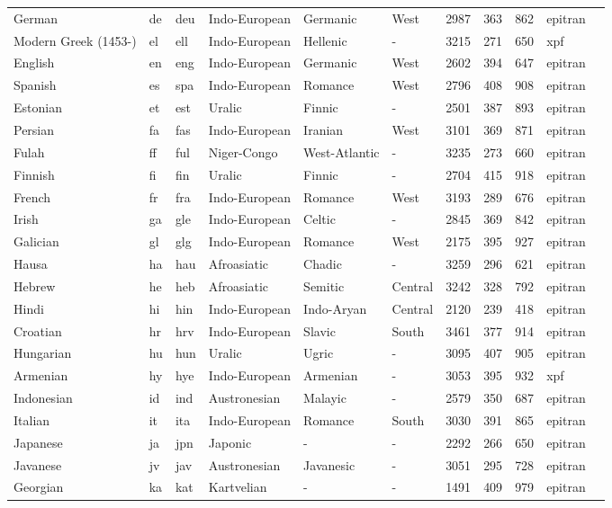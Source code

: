 \begin{longtable}{lllllllllll}
German & de & deu & Indo-European & Germanic & West & 2987 & 363 & 862 & epitran \\
Modern Greek (1453-) & el & ell & Indo-European & Hellenic & - & 3215 & 271 & 650 & xpf \\
English & en & eng & Indo-European & Germanic & West & 2602 & 394 & 647 & epitran \\
Spanish & es & spa & Indo-European & Romance & West & 2796 & 408 & 908 & epitran \\
Estonian & et & est & Uralic & Finnic & - & 2501 & 387 & 893 & epitran \\
Persian & fa & fas & Indo-European & Iranian & West & 3101 & 369 & 871 & epitran \\
Fulah & ff & ful & Niger-Congo & West-Atlantic & - & 3235 & 273 & 660 & epitran \\
Finnish & fi & fin & Uralic & Finnic & - & 2704 & 415 & 918 & epitran \\
French & fr & fra & Indo-European & Romance & West & 3193 & 289 & 676 & epitran \\
Irish & ga & gle & Indo-European & Celtic & - & 2845 & 369 & 842 & epitran \\
Galician & gl & glg & Indo-European & Romance & West & 2175 & 395 & 927 & epitran \\
Hausa & ha & hau & Afroasiatic & Chadic & - & 3259 & 296 & 621 & epitran \\
Hebrew & he & heb & Afroasiatic & Semitic & Central & 3242 & 328 & 792 & epitran \\
Hindi & hi & hin & Indo-European & Indo-Aryan & Central & 2120 & 239 & 418 & epitran \\
Croatian & hr & hrv & Indo-European & Slavic & South & 3461 & 377 & 914 & epitran \\
Hungarian & hu & hun & Uralic & Ugric & - & 3095 & 407 & 905 & epitran \\
Armenian & hy & hye & Indo-European & Armenian & - & 3053 & 395 & 932 & xpf \\
Indonesian & id & ind & Austronesian & Malayic & - & 2579 & 350 & 687 & epitran \\
Italian & it & ita & Indo-European & Romance & South & 3030 & 391 & 865 & epitran \\
Japanese & ja & jpn & Japonic & - & - & 2292 & 266 & 650 & epitran \\
Javanese & jv & jav & Austronesian & Javanesic & - & 3051 & 295 & 728 & epitran \\
Georgian & ka & kat & Kartvelian & - & - & 1491 & 409 & 979 & epitran \\

\end{longtable}
